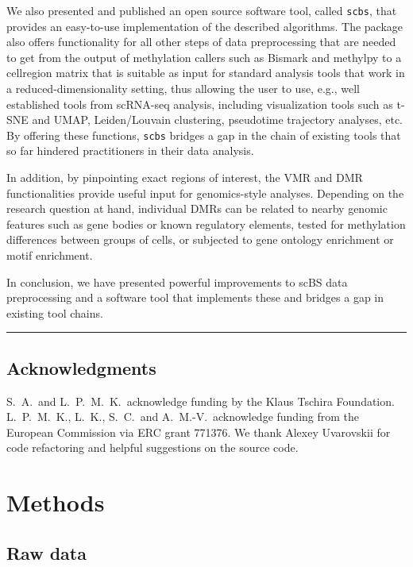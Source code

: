 \documentclass[twocolumn,10pt]{article}
\begin{document}
We also presented and published an open source software tool, called \texttt{scbs}, that provides an easy-to-use implementation of the described algorithms.
The package also offers functionality for all other steps of data preprocessing that are needed to get from the output of methylation callers such as Bismark and methylpy to a cell\texttimes region matrix that is suitable as input for standard analysis tools that work in a reduced-dimensionality setting, thus allowing the user to use, e.g., well established tools from scRNA-seq analysis, including visualization tools such as t-SNE and UMAP, Leiden/Louvain clustering, pseudotime trajectory analyses, etc.
By offering these functions, \texttt{scbs} bridges a gap in the chain of existing tools that so far hindered practitioners in their data analysis.

In addition, by pinpointing exact regions of interest, the VMR and DMR functionalities provide useful input for genomics-style analyses.
Depending on the research question at hand, individual DMRs can be related to nearby genomic features such as gene bodies or known regulatory elements, tested for methylation differences between groups of cells, or subjected to gene ontology enrichment or motif enrichment.

In conclusion, we have presented powerful improvements to scBS data preprocessing and a software tool that implements these and bridges a gap in existing tool chains.



\vspace{1.4ex}
\noindent\hfil\rule{.6\columnwidth}{.2pt}\hfil

\subsection{Acknowledgments}

S.\ A.\ and L.\ P.\ M.\ K.\ acknowledge funding by the Klaus Tschira Foundation.
L.\ P.\ M.\ K., L.\ K., S.\ C.\ and A.\ M.-V.\ acknowledge funding from the European Commission via ERC grant 771376.
We thank Alexey Uvarovskii for code refactoring and helpful suggestions on the source code.


\section{Methods}

\subsection{Raw data}
\end{document}

